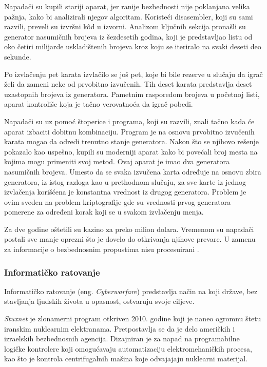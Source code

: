 \documentclass[a4paper]{article}
\begin{document}
Napadači su kupili stariji aparat, jer ranije bezbednosti nije poklanjana velika pažnja, kako bi analizirali njegov algoritam. Koristeći disasembler, koji su sami razvili, preveli su izvršni kôd u izvorni. Analizom ključnih sekcija pronašli su generator nasumičnih brojeva iz šezdesetih godina, koji je predstavljao listu od oko četiri milijarde uskladištenih brojeva kroz koju se iteriralo na svaki deseti deo sekunde.

Po izvlačenju pet karata izvlačilo se još pet, koje bi bile rezerve u slučaju da igrač želi da zameni neke od prvobitno izvučenih. Tih deset karata predstavlja deset uzastopnih brojeva iz generatora. Pametnim rasporedom brojeva u početnoj listi, aparat kontroliše koja je tačno verovatnoća da igrač pobedi. 

Napadači su uz pomoć štoperice i programa, koji su razvili, znali tačno kada će aparat izbaciti dobitnu kombinaciju. Program je na osnovu prvobitno izvučenih karata mogao da odredi trenutno stanje generatora.
Nakon što se njihovo rešenje pokazalo kao uspešno, kupili su moderniji aparat kako bi povećali broj mesta na kojima mogu primeniti svoj metod. Ovaj aparat je imao dva generatora nasumičnih brojeva. Umesto da se svaka izvučena karta određuje na osnovu zbira generatora, iz istog razloga kao u prethodnom slučaju, za sve karte iz jednog izvlačenja korišćena je konstantna vrednost iz drugog generatora. Problem je ovim sveden na problem kriptografije gde su vrednosti prvog generatora pomerene za određeni korak koji se u svakom izvlačenju menja.

Za dve godine oštetili su kazino za preko milion dolara. Vremenom su napadači postali sve manje oprezni što je dovelo do otkrivanja njihove prevare. U zamenu za informacije o bezbednosnim propustima nisu procesuirani \cite{intrusion}.

\subsubsection{Informatičko ratovanje}
\label{cyberwarfare}

Informatičko ratovanje (eng. \textit{Cyberwarfare}) predstavlja način na koji države, bez stavljanja ljudskih života u opasnost, ostvaruju svoje ciljeve.

\textit{Stuxnet} je zlonamerni program otkriven 2010. godine koji je naneo ogromnu štetu iranskim nuklearnim elektranama. Pretpostavlja se da je delo američkih i izraelskih bezbednosnih agencija. Dizajniran je za napad na programabilne logičke kontrolere koji omogućavaju automatizaciju elektromehaničkih procesa, kao što je kontrola centrifugalnih mašina koje odvajajaju nuklearni materijal.
\end{document}
